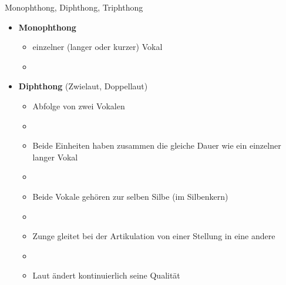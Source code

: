 \begin{frame}{Monophthong, Diphthong, Triphthong}

\begin{itemize}
	\item \textbf{Monophthong}

	\begin{itemize}		
		\item einzelner (langer oder kurzer) Vokal
		\item[]
	\end{itemize}
	
	\item \textbf{Diphthong} (Zwielaut, Doppellaut)
	
	\begin{itemize}		
		\item Abfolge von zwei Vokalen
		\item[]
		\item Beide Einheiten haben zusammen die gleiche Dauer wie ein einzelner langer Vokal
		\item[]
		\item Beide Vokale gehören zur selben Silbe (im Silbenkern)
		\item[]
		\item Zunge gleitet bei der Artikulation von einer Stellung in eine andere
		\item[]
		\item Laut ändert kontinuierlich seine Qualität
	\end{itemize}
	
\end{itemize}	

\end{frame}



